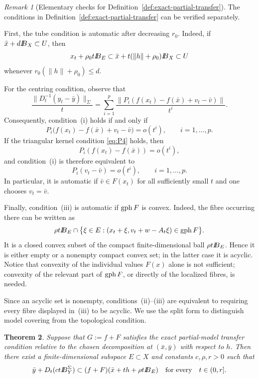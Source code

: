 \documentclass[11pt]{amsart}
\newtheorem{theorem}{Theorem}[section]
\theoremstyle{definition}
\theoremstyle{remark}
\newtheorem{remark}[theorem]{Remark}
\newcommand{\bx}{\bar x}
\newcommand{\by}{\bar y}
\newcommand{\bv}{\bar v}
\newcommand{\gph}{\mathop{\rm gph}\nolimits}
\def\ball{{I\kern -.35em B}}
\begin{document}
	\begin{remark}[Elementary checks for Definition~\ref{def:exact-partial-transfer}]
		\label{rem:partial-elementary-checks}
		The conditions in Definition~\ref{def:exact-partial-transfer} can be verified separately.
		
		First, the tube condition is automatic after decreasing $r_0$. Indeed,
		if $\bx+d\ball_X\subset U$, then
		$$
		x_t+\rho_0t\ball_E
		\subset
		\bx+t(\|h\|+\rho_0)\ball_X
		\subset U
		$$
		whenever $r_0(\|h\|+\rho_0)\le d$.
		
		For the centring condition, observe that
		$$
		\frac{\|D_t^{-1}(y_t-\by)\|_\Sigma}{t}
		=
		\sum_{i=1}^p
		\frac{
			\|P_i(f(x_t)-f(\bx)+v_t-\bv)\|
		}{t^i}.
		$$
		Consequently, condition~{\rm (i)} holds if and only if
		$$
		P_i\bigl(f(x_t)-f(\bx)+v_t-\bv\bigr)=o(t^i),
		\qquad i=1,\ldots,p.
		$$
		If the triangular kernel condition \eqref{eq:P4} holds, then
		$$
		P_i(f(x_t)-f(\bx))=o(t^i),
		$$
		and condition~{\rm (i)} is therefore equivalent to
		$$
		P_i(v_t-\bv)=o(t^i),
		\qquad i=1,\ldots,p.
		$$
		In particular, it is automatic if $\bv\in F(x_t)$ for all sufficiently
		small $t$ and one chooses $v_t=\bv$.
		
		Finally, condition~{\rm (iii)} is automatic if $\gph F$ is convex.
		Indeed, the fibre occurring there can be written as
		$$
		\rho t\ball_E\cap
		\bigl\{
		\xi\in E:
		(x_t+\xi,v_t+w-A_t\xi)\in\gph F
		\bigr\}.
		$$
		It is a closed convex subset of the compact finite-dimensional ball
		$\rho t\ball_E$. Hence it is either empty or a nonempty compact convex
		set; in the latter case it is acyclic. Notice that convexity of the
		individual values
		$F(x)$ alone is not sufficient; convexity of the relevant part of
		$\gph F$, or directly of the localized fibres, is needed.
	\end{remark}
	Since an acyclic set is nonempty, conditions~{\rm (ii)}--{\rm (iii)}
	are equivalent to requiring every fibre displayed in~{\rm (iii)} to be
	acyclic.  We use the split form to distinguish model covering from the
	topological condition.
	
	\begin{theorem}
		\label{thm:exact-partial-transfer}
		Suppose that $G:=f+F$ satisfies the exact partial-model transfer condition
		relative to the chosen decomposition at $(\bx,\by)$ with respect to $h$.
		Then there exist a finite-dimensional
		subspace $E\subset X$ and constants $c,\rho,r>0$ such that
		\begin{equation}
			\by+D_t(ct\ball_Y^{\Sigma})
			\subset(f+F)(\bx+th+\rho t\ball_E)
			\quad\text{for every}\quad t\in(0,r].
			\label{eq:PG9}
		\end{equation}
	\end{theorem}
	
\end{document}
